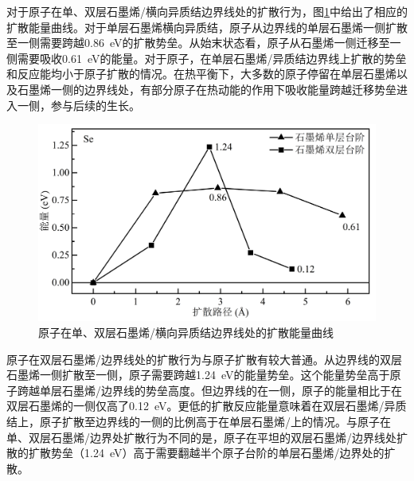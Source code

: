     对于原子在单、双层石墨烯/横向异质结边界线处的扩散行为，图\ref{fig:VS_DFT_NEB_Se_GtVSe}中给出了相应的扩散能量曲线。对于单层石墨烯横向异质结，原子从边界线的单层石墨烯一侧扩散至一侧需要跨越\SI{0.86}{\electronvolt}的扩散势垒。从始末状态看，原子从石墨烯一侧迁移至一侧需要吸收\SI{0.61}{\electronvolt}的能量。对于原子，在单层石墨烯/异质结边界线上扩散的势垒和反应能均小于原子扩散的情况。在热平衡下，大多数的原子停留在单层石墨烯以及石墨烯一侧的边界线处，有部分原子在热动能的作用下吸收能量跨越迁移势垒进入一侧，参与后续的生长。
    
    \begin{figure}[htb]
        \includegraphics{pic/VS_DFT_NEB_Se_GtVSe.png}
        \caption{原子在单、双层石墨烯/横向异质结边界线处的扩散能量曲线}
        \label{fig:VS_DFT_NEB_Se_GtVSe}
    \end{figure}

    原子在双层石墨烯/边界线处的扩散行为与原子扩散有较大普通。从边界线的双层石墨烯一侧扩散至一侧，原子需要跨越\SI{1.24}{\electronvolt}的能量势垒。这个能量势垒高于原子跨越单层石墨烯/边界线的势垒高度。但边界线的在一侧，原子的能量相比于在双层石墨烯的一侧仅高了\SI{0.12}{\electronvolt}。更低的扩散反应能量意味着在双层石墨烯/异质结上，原子扩散至边界线的一侧的比例高于在单层石墨烯/上的情况。与原子在单、双层石墨烯/边界处扩散行为不同的是，原子在平坦的双层石墨烯/边界线处扩散的扩散势垒（\SI{1.24}{\electronvolt}）高于需要翻越半个原子台阶的单层石墨烯/边界处的扩散。
    
